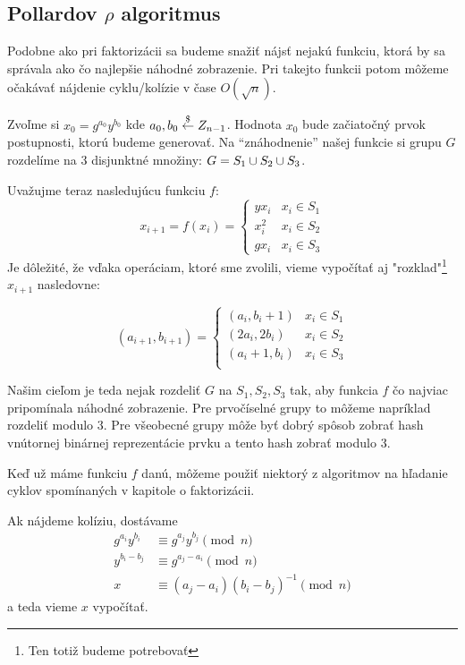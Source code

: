 \subsection{Pollardov $\rho$ algoritmus}
Podobne ako pri faktorizácii sa budeme snažiť nájsť nejakú funkciu, ktorá
by sa správala ako čo najlepšie náhodné zobrazenie. Pri takejto funkcii
potom môžeme očakávať nájdenie cyklu/kolízie v čase $O(\sqrt{n})$.

Zvoľme si $x_0 = g^{a_0} y^{b_0}$ kde $a_0,b_0 \overset{\$}{\leftarrow} Z_{n-1}$. Hodnota
$x_0$ bude začiatočný prvok postupnosti, ktorú budeme generovať.
Na ``znáhodnenie'' našej funkcie si grupu $G$ rozdelíme na 3 disjunktné množiny:
$G=S_1 \cup S_2 \cup  S_3$.

Uvažujme teraz nasledujúcu funkciu $f$:
\begin{equation*}
    x_{i+1} = f(x_i) =
        \begin{cases}
         y x_i & x_i \in S_1 \\
         x_i^2 & x_i \in S_2 \\
         g x_i & x_i \in S_3
        \end{cases}
\end{equation*}
Je dôležité, že vďaka operáciam, ktoré sme zvolili, vieme vypočítať aj
"rozklad"\footnote{Ten totiž budeme potrebovať} $x_{i+1}$ nasledovne:

\begin{equation*}
    (a_{i+1},b_{i+1}) =
        \begin{cases}
         (a_i,b_i+1) & x_i \in S_1 \\
         (2a_i,2b_i) & x_i \in S_2 \\
         (a_i+1,b_i) & x_i \in S_3 \\
        \end{cases}
\end{equation*}

Našim cieľom je teda nejak rozdeliť $G$ na $S_1,S_2,S_3$ tak, aby
funkcia $f$ čo najviac pripomínala náhodné zobrazenie.
Pre prvočíselné grupy to môžeme napríklad rozdeliť modulo 3.
Pre všeobecné grupy môže byť dobrý spôsob zobrať hash vnútornej binárnej
reprezentácie prvku a tento hash zobrať modulo 3.

Keď už máme funkciu $f$ danú, môžeme použiť niektorý z algoritmov na
hľadanie cyklov spomínaných v kapitole o faktorizácii.

Ak nájdeme kolíziu, dostávame
\begin{align*}
    g^{a_i} y^{b_i} &\equiv g^{a_j} y^{b_j} \pmod n\\
    y^{b_i-b_j} &\equiv g^{a_j-a_i} \pmod n\\
    x &\equiv(a_j - a_i)(b_i-b_j)^{-1} \pmod n
\end{align*}
a teda vieme $x$ vypočítať.

